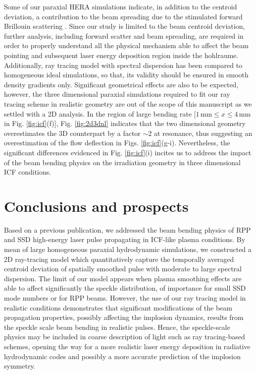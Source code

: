 \documentclass[%
 reprint,
 amsmath,amssymb,
 aps,
]{revtex4-1}
\begin{document}
Some  of our paraxial HERA simulations indicate, in addition to the centroid deviation, a contribution to the beam spreading   due to the stimulated forward Brillouin scattering \cite[]{PRL_Grech_2009,POP_Hinkel_1998}. 
Since our study is limited to the beam centroid deviation, further analysis, including forward scatter and beam spreading, are required in order to properly understand all the physical mechanism able to affect the beam pointing and subsequent laser energy deposition region inside the hohlraume.
Additionally, ray tracing model with spectral dispersion has been compared to   homogeneous ideal simulations, so that, its   validity should be ensured in   smooth density gradients only. Significant geometrical effects are also to be expected, however,  the three dimensional paraxial simulations required to fit our ray tracing scheme in realistic geometry are out of the scope of this manuscript as we settled with a 2D analysis.
In the region of large bending rate [$1\,\mathrm{mm} \le x\le 4\,\mathrm{mm}$ in Fig. \ref{fig:icf}(f)], Fig. \ref{fig:2d3dnl} indicates that  the two dimensional geometry overestimates the  3D counterpart by a factor $\sim 2$ at resonance, thus suggesting  an overestimation of the flow  deflection in Figs. \ref{fig:icf}(g-i). 
Nevertheless, the significant differences evidenced in Fig. \ref{fig:icf}(i) incites us to address the impact of the beam bending physics on the irradiation geometry in three dimensional ICF conditions.

\section{Conclusions and prospects}
Based on a previous publication, we addressed the beam bending physics of RPP and SSD high-energy laser pulse propagating in  ICF-like plasma conditions. 
By mean of large homogeneous paraxial hydrodynamic simulations, we constructed a 2D ray-tracing model which  quantitatively capture the temporally averaged  centroid deviation  of spatially smoothed pulse  with moderate to large spectral dispersion. The limit of our model appears when  plasma smoothing effects are able to affect significantly the speckle distribution, of importance for small SSD mode numbers or for RPP beams. 
However, the use of our ray tracing model in realistic conditions demonstrates that significant modifications of the beam propagation properties, possibly affecting the implosion dynamics, results from the speckle scale beam bending in realistic pulses. 
Hence, the speckle-scale physics  may be included in coarse description of light such as  ray tracing-based schemes, opening the way for a more realistic laser energy deposition in radiative hydrodynamic codes and possibly a more accurate prediction of the implosion symmetry. 
\end{document}

